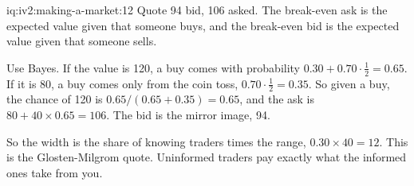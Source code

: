 \begin{solution}{iq:iv2:making-a-market:12}
Quote 94 bid, 106 asked. The break-even ask is the expected value given that someone buys, and the break-even bid is the expected value given that someone sells.

Use Bayes. If the value is 120, a buy comes with probability $0.30 + 0.70 \cdot \tfrac12 = 0.65$. If it is 80, a buy comes only from the coin toss, $0.70 \cdot \tfrac12 = 0.35$. So given a buy, the chance of 120 is $0.65/(0.65 + 0.35) = 0.65$, and the ask is $80 + 40 \times 0.65 = 106$. The bid is the mirror image, 94.

So the width is the share of knowing traders times the range, $0.30 \times 40 = 12$. This is the Glosten-Milgrom quote. Uninformed traders pay exactly what the informed ones take from you.

\end{solution}


